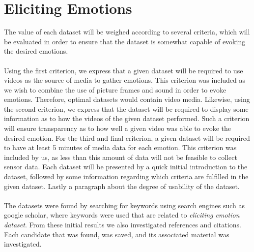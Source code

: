 \section{Eliciting Emotions}
\label{Datasets}
The value of each dataset will be weighed according to several criteria, which will be evaluated in order to ensure that the dataset is somewhat capable of evoking the desired emotions.\\\\
Using the first criterion, we express that a given dataset will be required to use videos as the source of media to gather emotions. This criterion was included as we wish to combine the use of picture frames and sound in order to evoke emotions. Therefore, optimal datasets would contain video media.
Likewise, using the second criterion, we express that the dataset will be required to display some information as to how the videos of the given dataset performed. Such a criterion will ensure transparency as to how well a given video was able to evoke the desired emotion.
For the third and final criterion, a given dataset will be required to have at least 5 minutes of media data for each emotion. This criterion was included by us, as less than this amount of data will not be feasible to collect sensor data.
Each dataset will be presented by a quick initial introduction to the dataset, followed by some information regarding which criteria are fulfilled in the given dataset. Lastly a paragraph about the degree of usability of the dataset. \\\\
The datasets were found by searching for keywords using search engines such as google scholar, where keywords were used that are related to \textit{eliciting emotion dataset}. From these initial results we also investigated references and citations. Each candidate that was found, was saved, and its associated material was investigated. 

